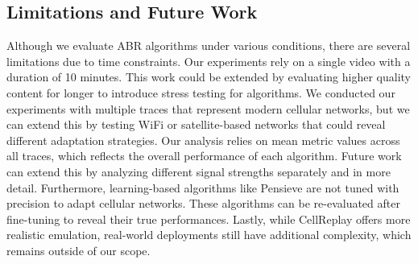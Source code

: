 \subsection*{Limitations and Future Work}

Although we evaluate ABR algorithms under various conditions, there are several limitations due to time constraints. Our experiments rely on a single video with a duration of 10 minutes. This work could be extended by evaluating higher quality content for longer to introduce stress testing for algorithms. We conducted our experiments with multiple traces that represent modern cellular networks, but we can extend this by testing WiFi or satellite-based networks that could reveal different adaptation strategies. Our analysis relies on mean metric values across all traces, which reflects the overall performance of each algorithm. Future work can extend this by analyzing different signal strengths separately and in more detail. Furthermore, learning-based algorithms like Pensieve are not tuned with precision to adapt cellular networks. These algorithms can be re-evaluated after fine-tuning to reveal their true performances. Lastly, while CellReplay offers more realistic emulation, real-world deployments still have additional complexity, which remains outside of our scope.

